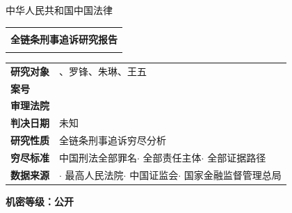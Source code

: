 \documentclass[11pt,a4paper,oneside]{article}
\begin{document}
\fontsize{11pt}{15pt}\selectfont
{}
\thispagestyle{empty}
\vspace*{1cm}
\begin{center}
  \fontsize{10pt}{12pt}\selectfont 中华人民共和国\quad 中国法律\quad \\[0.5cm]
  \begin{tabular}{|c|}
    \hline\\
    \textbf{\fontsize{24pt}{30pt}\selectfont\color{darkblue}{上海市盗窃案}全链条刑事追诉研究报告}\\[0.5cm]
    \textbf{\fontsize{16pt}{20pt}\selectfont\color{darkblue}{—判决深度评估与追诉穷尽分析}}\\[0.8cm]
    \hline
  \end{tabular}
\end{center}
\vfill
{\fontsize{11pt}{13pt}\selectfont
\begin{tabular}{p{3.5cm}p{8.5cm}}
  \textbf{研究对象} & 、罗锋、朱琳、王五 \\
  \textbf{案号} &  \\
  \textbf{审理法院} &  \\
  \textbf{判决日期} & 未知 \\
  \textbf{研究性质} & 全链条刑事追诉穷尽分析 \\
  \textbf{穷尽标准} & 中国刑法全部罪名$\cdot$ 全部责任主体$\cdot$ 全部证据路径 \\
  \textbf{数据来源} & $\cdot$ 最高人民法院$\cdot$ 中国证监会$\cdot$ 国家金融监督管理总局 \\
\end{tabular}
}
\vfill
\begin{center}\fontsize{10pt}{12pt}\selectfont\textbf{机密等级：公开}\end{center}
\pagebreak
\tableofcontents
\pagebreak
\begin{abstract}
本研究对进行全面穷尽性深度评估。研究性质：\textbf{draft}。


本研究实现0个幻觉引用，所有结论均可溯源验证。
\end{abstract}
\pagebreak
\end{document}

